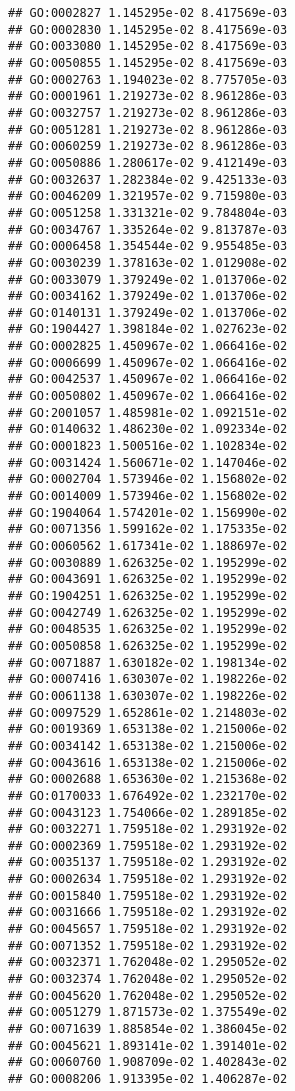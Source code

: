 \documentclass[
]{article}
\begin{document}
\begin{verbatim}
## GO:0002827 1.145295e-02 8.417569e-03
## GO:0002830 1.145295e-02 8.417569e-03
## GO:0033080 1.145295e-02 8.417569e-03
## GO:0050855 1.145295e-02 8.417569e-03
## GO:0002763 1.194023e-02 8.775705e-03
## GO:0001961 1.219273e-02 8.961286e-03
## GO:0032757 1.219273e-02 8.961286e-03
## GO:0051281 1.219273e-02 8.961286e-03
## GO:0060259 1.219273e-02 8.961286e-03
## GO:0050886 1.280617e-02 9.412149e-03
## GO:0032637 1.282384e-02 9.425133e-03
## GO:0046209 1.321957e-02 9.715980e-03
## GO:0051258 1.331321e-02 9.784804e-03
## GO:0034767 1.335264e-02 9.813787e-03
## GO:0006458 1.354544e-02 9.955485e-03
## GO:0030239 1.378163e-02 1.012908e-02
## GO:0033079 1.379249e-02 1.013706e-02
## GO:0034162 1.379249e-02 1.013706e-02
## GO:0140131 1.379249e-02 1.013706e-02
## GO:1904427 1.398184e-02 1.027623e-02
## GO:0002825 1.450967e-02 1.066416e-02
## GO:0006699 1.450967e-02 1.066416e-02
## GO:0042537 1.450967e-02 1.066416e-02
## GO:0050802 1.450967e-02 1.066416e-02
## GO:2001057 1.485981e-02 1.092151e-02
## GO:0140632 1.486230e-02 1.092334e-02
## GO:0001823 1.500516e-02 1.102834e-02
## GO:0031424 1.560671e-02 1.147046e-02
## GO:0002704 1.573946e-02 1.156802e-02
## GO:0014009 1.573946e-02 1.156802e-02
## GO:1904064 1.574201e-02 1.156990e-02
## GO:0071356 1.599162e-02 1.175335e-02
## GO:0060562 1.617341e-02 1.188697e-02
## GO:0030889 1.626325e-02 1.195299e-02
## GO:0043691 1.626325e-02 1.195299e-02
## GO:1904251 1.626325e-02 1.195299e-02
## GO:0042749 1.626325e-02 1.195299e-02
## GO:0048535 1.626325e-02 1.195299e-02
## GO:0050858 1.626325e-02 1.195299e-02
## GO:0071887 1.630182e-02 1.198134e-02
## GO:0007416 1.630307e-02 1.198226e-02
## GO:0061138 1.630307e-02 1.198226e-02
## GO:0097529 1.652861e-02 1.214803e-02
## GO:0019369 1.653138e-02 1.215006e-02
## GO:0034142 1.653138e-02 1.215006e-02
## GO:0043616 1.653138e-02 1.215006e-02
## GO:0002688 1.653630e-02 1.215368e-02
## GO:0170033 1.676492e-02 1.232170e-02
## GO:0043123 1.754066e-02 1.289185e-02
## GO:0032271 1.759518e-02 1.293192e-02
## GO:0002369 1.759518e-02 1.293192e-02
## GO:0035137 1.759518e-02 1.293192e-02
## GO:0002634 1.759518e-02 1.293192e-02
## GO:0015840 1.759518e-02 1.293192e-02
## GO:0031666 1.759518e-02 1.293192e-02
## GO:0045657 1.759518e-02 1.293192e-02
## GO:0071352 1.759518e-02 1.293192e-02
## GO:0032371 1.762048e-02 1.295052e-02
## GO:0032374 1.762048e-02 1.295052e-02
## GO:0045620 1.762048e-02 1.295052e-02
## GO:0051279 1.871573e-02 1.375549e-02
## GO:0071639 1.885854e-02 1.386045e-02
## GO:0045621 1.893141e-02 1.391401e-02
## GO:0060760 1.908709e-02 1.402843e-02
## GO:0008206 1.913395e-02 1.406287e-02

\end{verbatim}
\end{document}
